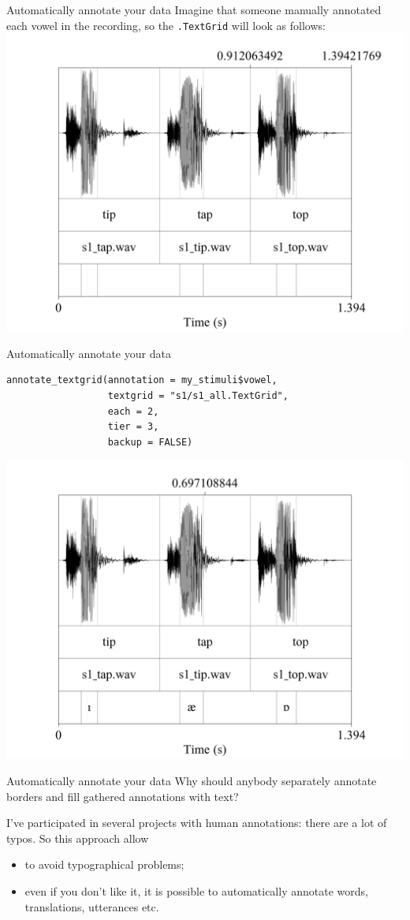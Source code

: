 \documentclass[13pt, t]{beamer}
\begin{document}
\begin{frame}[fragile]{Automatically annotate your data}
Imagine that someone manually annotated each vowel in the recording, so the \texttt{.TextGrid} will look as follows:
\includegraphics[width=0.92\linewidth]{images/05_annotate.png}
\end{frame}

\begin{frame}[fragile]{Automatically annotate your data}
\begin{verbatim}
annotate_textgrid(annotation = my_stimuli$vowel,
                  textgrid = "s1/s1_all.TextGrid",
                  each = 2,
                  tier = 3, 
                  backup = FALSE)
\end{verbatim}
\includegraphics[width=0.7\linewidth]{images/06_annotate.png}
\end{frame}

\begin{frame}[fragile]{Automatically annotate your data}
Why should anybody separately annotate borders and fill gathered annotations with text?

I've participated in several projects with human annotations: there are a lot of typos. So this approach allow

\begin{itemize}
\item to avoid typographical problems; \pause
\item even if you don't like it, it is possible to automatically annotate words, translations, utterances etc.
\end{itemize} 
\end{frame}
\end{document}
